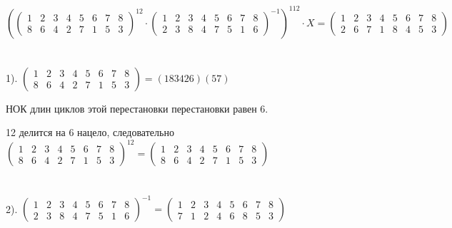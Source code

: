 \documentclass[a4paper, 12pt]{article}
\begin{document}
    \[
        \left( \begin{pmatrix}1 & 2 & 3 & 4 & 5 & 6 & 7 & 8 \\ 8 & 6 & 4 & 2 & 7 & 1 & 5 & 3 \end{pmatrix}^{12} \cdot \begin{pmatrix}1 & 2 & 3 & 4 & 5 & 6 & 7 & 8 \\ 2 & 3 & 8 & 4 & 7 & 5 & 1 & 6 \end{pmatrix}^{-1} \right)^{112} \cdot X = \begin{pmatrix}1 & 2 & 3 & 4 & 5 & 6 & 7 & 8 \\ 2 & 6 & 7 & 1 & 8 & 4 & 5 & 3 \end{pmatrix}
    \]
    \\
    \\ 1). $\begin{pmatrix}1 & 2 & 3 & 4 & 5 & 6 & 7 & 8 \\ 8 & 6 & 4 & 2 & 7 & 1 & 5 & 3 \end{pmatrix} = (183426)(57)$ 
    \\ 
    \par НОК длин циклов этой перестановки перестановки равен 6. 
    \par 12 делится на 6 нацело, следовательно $\begin{pmatrix}1 & 2 & 3 & 4 & 5 & 6 & 7 & 8 \\ 8 & 6 & 4 & 2 & 7 & 1 & 5 & 3 \end{pmatrix}^{12} = \begin{pmatrix}1 & 2 & 3 & 4 & 5 & 6 & 7 & 8 \\ 8 & 6 & 4 & 2 & 7 & 1 & 5 & 3 \end{pmatrix}$
    \\
    \\
    \\ 2). $\begin{pmatrix}1 & 2 & 3 & 4 & 5 & 6 & 7 & 8 \\ 2 & 3 & 8 & 4 & 7 & 5 & 1 & 6 \end{pmatrix}^{-1} = \begin{pmatrix}1 & 2 & 3 & 4 & 5 & 6 & 7 & 8 \\ 7 & 1 & 2 & 4 & 6 & 8 & 5 & 3 \end{pmatrix}$
    \\
    \\
\end{document}
